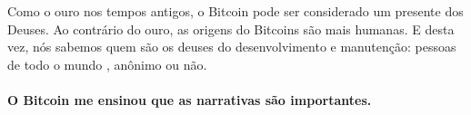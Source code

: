 Como o ouro nos tempos antigos, o Bitcoin pode ser considerado um presente dos
Deuses. Ao contrário do ouro, as origens do Bitcoins são mais humanas. E desta vez, nós
sabemos quem são os deuses do desenvolvimento e manutenção: pessoas de todo o mundo
, anônimo ou não.

\paragraph{O Bitcoin me ensinou que as narrativas são importantes.}

%
%
%
%
